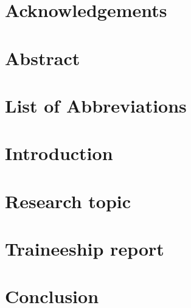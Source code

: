 \documentclass[12pt,a4paper]{article}
\newcommand\blankpage{\null\thispagestyle{empty}\newpage}
\begin{document}
  

  \blankpage

  


  \newpage
  \section*{Acknowledgements}
  

  \newpage
  \section*{Abstract}
  

  \newpage
  \tableofcontents

  \newpage
  \listoffigures

  \newpage
  \listoftables

  \newpage
  \section*{List of Abbreviations}
  

  \newpage
  \section*{Introduction} 
  


  \newpage

  \section{Research topic}
  
  \newpage

  \section{Traineeship report} 
  

  \newpage
  \section{Conclusion}
  
\end{document}
